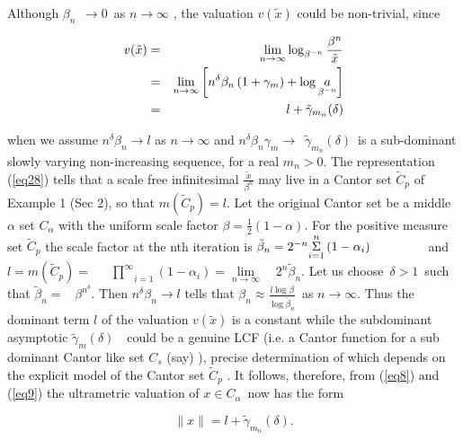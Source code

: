 \documentclass[12pt]{article}
\begin{document}
\vspace{.25cm}

Although $\beta _{n\text{ }}\rightarrow 0$\ as $n\rightarrow \infty $ , the
valuation $v(\tilde{x})$ could be non-trivial, since

\begin{eqnarray}\label{eq29}
v(\tilde{x}) &=&\underset{n\rightarrow \infty }{\lim }\log_{\beta
^{-n}}{\frac{\beta ^{n}}{\tilde{x}}} \\
&=&\underset{n\rightarrow \infty }{\lim }\left[ n^{\delta }\beta _{n}\left(
1+\gamma _{m}\right) +\log \underset{\beta ^{-n}}{a}\right]  \notag \\
&=&l+\tilde{\gamma}_{m_{n}}(\delta )  \notag
\end{eqnarray}

\noindent when we assume $n^{\delta }\beta _{n}\rightarrow l$ as $%
n\rightarrow \infty $ and $n^{\delta }\beta _{n}\gamma _{m}\rightarrow $\ $%
\tilde{\gamma}_{m_{n}}(\delta )$\ is a sub-dominant slowly varying
non-increasing sequence, for a real $m_n>0$. The representation (\ref{eq28}) tells that a scale free infinitesimal $\frac{\tilde{x}}{\beta ^{n}}$ may live in a Cantor set $\tilde C_{p}$ of Example 1 (Sec 2), so that $m(\tilde C_{p})=l$. Let the original Cantor set be a
middle $\alpha $ set $C_{\alpha }$ with the uniform scale factor $\beta =%
\frac{1}{2}(1-\alpha )$. For the positive measure set $\tilde C_{p}$ the scale
factor at the nth iteration is $\tilde{\beta}_{n}=2^{-n}\underset{i=1}{%
\overset{n }{\Sigma }}\left( 1-\alpha _{i}\right) $\ \ \ \ \ \ \ \ \
and $l=m\left( \tilde C_{p}\right) =$\ \ \ $\underset{i=1}{\overset{\infty }{\prod
}}\left( 1-\alpha _{i}\right) =\underset{n\rightarrow \infty }{\lim }$\ \ $%
2^n\tilde{\beta}_{n}.$  Let us choose\ $\delta >1$\ such that $\tilde{\beta}_{n}=$%
\ $\beta ^{n^{\delta }}$. Then $n^{\delta }\beta _{n}\rightarrow l$ tells
that $\beta _{n}\approx \frac{l\log \beta  }{\log \tilde \beta_n}$\ as $%
n\rightarrow \infty $. Thus the dominant term $l$ of the valuation $v(%
\tilde{x})$ is a constant while the subdominant asymptotic $\tilde{\gamma}%
_{m}(\delta )$\ \ could be a genuine LCF (i.e. a
Cantor function for a sub dominant Cantor like set $C_s$ (say) ), precise
determination of which depends on the explicit model of the Cantor set $\tilde C_{p}$%
. It follows, therefore, from (\ref{eq8}) and (\ref{eq9}) the ultrametric valuation of $x\in
C_{\alpha }$\ now has the form

\begin{equation}\label{eq30}
\parallel x\parallel =l+\tilde{\gamma}_{m_{n}}(\delta ). 
\end{equation}
\end{document}

